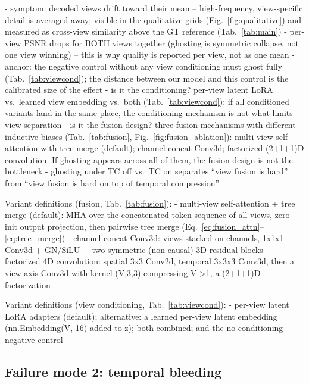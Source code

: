 - symptom: decoded views drift toward their mean -- high-frequency, view-specific detail is averaged away; visible in the qualitative grids (Fig.~\ref{fig:qualitative}) and measured as cross-view similarity above the GT reference (Tab.~\ref{tab:main})
- per-view PSNR drops for BOTH views together (ghosting is symmetric collapse, not one view winning) -- this is why quality is reported per view, not as one mean
- anchor: the negative control without any view conditioning must ghost fully (Tab.~\ref{tab:viewcond}); the distance between our model and this control is the calibrated size of the effect
- is it the conditioning? per-view latent LoRA vs.\ learned view embedding vs.\ both (Tab.~\ref{tab:viewcond}): if all conditioned variants land in the same place, the conditioning mechanism is not what limits view separation
- is it the fusion design? three fusion mechanisms with different inductive biases (Tab.~\ref{tab:fusion}, Fig.~\ref{fig:fusion_ablation}): multi-view self-attention with tree merge (default); channel-concat Conv3d; factorized (2+1+1)D convolution. If ghosting appears across all of them, the fusion design is not the bottleneck
- ghosting under TC off vs.\ TC on separates ``view fusion is hard'' from ``view fusion is hard on top of temporal compression''

Variant definitions (fusion, Tab.~\ref{tab:fusion}):
- multi-view self-attention + tree merge (default): MHA over the concatenated token sequence of all views, zero-init output projection, then pairwise tree merge (Eq.~\ref{eq:fusion_attn}--\ref{eq:tree_merge})
- channel concat Conv3d: views stacked on channels, 1x1x1 Conv3d + GN/SiLU + two symmetric (non-causal) 3D residual blocks
- factorized 4D convolution: spatial 3x3 Conv2d, temporal 3x3x3 Conv3d, then a view-axis Conv3d with kernel (V,3,3) compressing V->1, a (2+1+1)D factorization

Variant definitions (view conditioning, Tab.~\ref{tab:viewcond}):
- per-view latent LoRA adapters (default); alternative: a learned per-view latent embedding (nn.Embedding(V, 16) added to z); both combined; and the no-conditioning negative control

\subsection{Failure mode 2: temporal bleeding}

